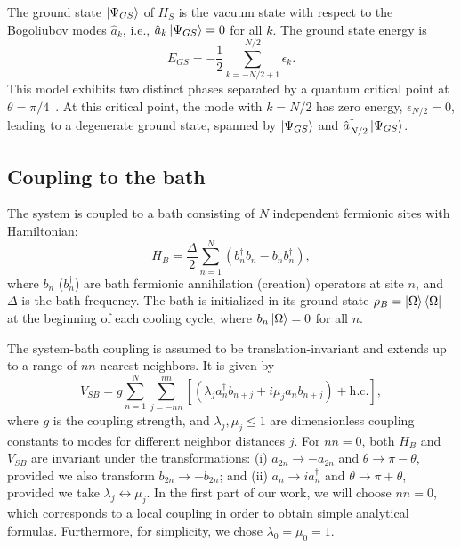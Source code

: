 \documentclass[aps,prx,twocolumn,superscriptaddress,nofootinbib,nolongbibliography,nobalancelastpage,10pt,floatfix]{revtex4-2}
\begin{document}
The ground state $\ket{\Psi_{GS}}$ of $H_S$ is the vacuum state with respect to the Bogoliubov modes $\hat{a}_k$, i.e., $\hat{a}_k\ket{\Psi_{GS}}=0$ for all $k$. The ground state energy is
\begin{equation}
    E_{GS} = - \frac{1}{2}\sum_{k=-N/2+1}^{N/2} \epsilon_k.
    \label{eq:EnergyGS}
\end{equation}
This model exhibits two distinct phases separated by a quantum critical point at $\theta = \pi/4$~\cite{Sachdev2011Quantum}. At this critical point, the mode with $k=N/2$ has zero energy, $\epsilon_{N/2}=0$, leading to a degenerate ground state, spanned by $\ket{\Psi_{GS}}$ and $\hat{a}_{N/2}^\dagger \ket{\Psi_{GS}}$.

\subsection{Coupling to the bath}
\label{subsec:coupling_bath}

The system is coupled to a bath consisting of $N$ independent fermionic sites with Hamiltonian:
\begin{equation}
    H_B = \frac{\Delta}{2}\sum_{n=1}^N \left(b_n^\dag b_n - b_n b_n^\dag\right),
    \label{eq:bath-hamiltonian-realspace}
\end{equation}
where $b_n$ ($b_n^\dag$) are bath fermionic annihilation (creation) operators at site $n$, and $\Delta$ is the bath frequency. The bath is initialized in its ground state $\rho_B=\ket{\Omega}\bra{\Omega}$ at the beginning of each cooling cycle, where $b_n\ket{\Omega}=0$ for all $n$.

The system-bath coupling is assumed to be translation-invariant and extends up to a range of $nn$ nearest neighbors. It is given by
\begin{equation}
    {V}_{SB} = g \sum_{n=1}^N \sum_{j=-nn}^{nn} \left[\left(\lambda_j a_n^\dag {b}_{n+j} + i \mu_j a_n {b}_{n+j}\right) + \text{h.c.}\right],
    \label{eq:system-bath-coupling_realspace}
\end{equation}
where $g$ is the coupling strength, and $\lambda_j,\mu_j\le 1$ are dimensionless coupling constants to modes for different neighbor distances $j$. For $nn=0$, both $H_B$ and $V_{SB}$ are invariant under the transformations: (i) $a_{2n}\to -a_{2n}$ and $\theta\to \pi-\theta$, provided we also transform $b_{2n}\to -b_{2n}$; and (ii) $a_{n}\to i a_{n}^\dagger$ and $\theta\to \pi+\theta$, provided we take $\lambda_{j}\leftrightarrow \mu_{j}$. In the first part of our work, we will choose $nn=0$, which corresponds to a local coupling in order to obtain simple analytical formulas. Furthermore, for simplicity, we chose $\lambda_0=\mu_0=1$.
\end{document}

